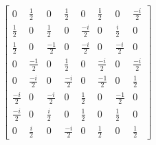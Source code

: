 \documentclass{article} %
\begin{document}
\begin{varwidth}{\linewidth}
\begin{align*}
    \left[\begin{array}{cccccccc}
        0 & \frac{1}{2} & 0 & \frac{1}{2} & 0 & \frac{\bm{i}}{2} & 0 & \frac{-i}{2} \\
        \frac{1}{2} & 0 & \frac{1}{2} & 0 & \frac{-i}{2} & 0 & \frac{i}{2} & 0 \\
        \frac{1}{2} & 0 & \frac{-1}{2} & 0 & \frac{-i}{2} & 0 & \frac{-i}{2} & 0 \\
        0 & \frac{-1}{2} & 0 & \frac{1}{2} & 0 & \frac{-i}{2} & 0 & \frac{-i}{2} \\
        0 & \frac{-i}{2} & 0 & \frac{-i}{2} & 0 & \frac{-1}{2} & 0 & \frac{1}{2} \\
        \frac{-i}{2} & 0 & \frac{-i}{2} & 0 & \frac{1}{2} & 0 & \frac{-1}{2} & 0 \\
        \frac{-i}{2} & 0 & \frac{i}{2} & 0 & \frac{1}{2} & 0 & \frac{1}{2} & 0 \\
        0 & \frac{i}{2} & 0 & \frac{-i}{2} & 0 & \frac{1}{2} & 0 & \frac{1}{2}
    \end{array}\right]
\end{align*}
\end{varwidth}
\end{document}
